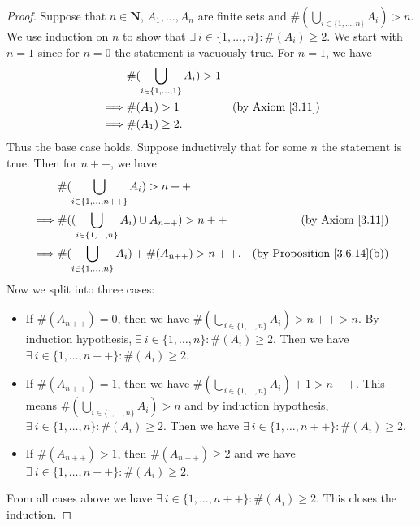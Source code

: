 \begin{proof}
    Suppose that \(n \in \mathbf{N}\), \(A_1, \dots, A_n\) are finite sets and \(\#(\bigcup_{i \in \{1, \dots, n\}} A_i) > n\).
    We use induction on \(n\) to show that \(\exists\ i \in \{1, \dots, n\} : \#(A_i) \geq 2\).
    We start with \(n = 1\) since for \(n = 0\) the statement is vacuously true.
    For \(n = 1\), we have
    \begin{align*}
                 & \#(\bigcup_{i \in \{1, \dots, 1\}} A_i) > 1                                \\
        \implies & \#(A_1) > 1                                 & \text{(by Axiom \ref{3.11})} \\
        \implies & \#(A_1) \geq 2.
    \end{align*}
    Thus the base case holds.
    Suppose inductively that for some \(n\) the statement is true.
    Then for \(n++\), we have
    \begin{align*}
                 & \#(\bigcup_{i \in \{1, \dots, n++\}} A_i) > n++                                                        \\
        \implies & \#((\bigcup_{i \in \{1, \dots, n\}} A_i) \cup A_{n++}) > n++ & \text{(by Axiom \ref{3.11})}            \\
        \implies & \#(\bigcup_{i \in \{1, \dots, n\}} A_i) + \#(A_{n++}) > n++. & \text{(by Proposition \ref{3.6.14}(b))}
    \end{align*}
    Now we split into three cases:
    \begin{itemize}
        \item If \(\#(A_{n++}) = 0\), then we have \(\#(\bigcup_{i \in \{1, \dots, n\}} A_i) > n++ > n\).
              By induction hypothesis, \(\exists\ i \in \{1, \dots, n\} : \#(A_i) \geq 2\).
              Then we have \(\exists\ i \in \{1, \dots, n++\} : \#(A_i) \geq 2\).
        \item If \(\#(A_{n++}) = 1\), then we have \(\#(\bigcup_{i \in \{1, \dots, n\}} A_i) + 1 > n++\).
              This means \(\#(\bigcup_{i \in \{1, \dots, n\}} A_i) > n\) and by induction hypothesis, \(\exists\ i \in \{1, \dots, n\} : \#(A_i) \geq 2\).
              Then we have \(\exists\ i \in \{1, \dots, n++\} : \#(A_i) \geq 2\).
        \item If \(\#(A_{n++}) > 1\), then \(\#(A_{n++}) \geq 2\) and we have \(\exists\ i \in \{1, \dots, n++\} : \#(A_i) \geq 2\).
    \end{itemize}
    From all cases above we have \(\exists\ i \in \{1, \dots, n++\} : \#(A_i) \geq 2\).
    This closes the induction.
\end{proof}